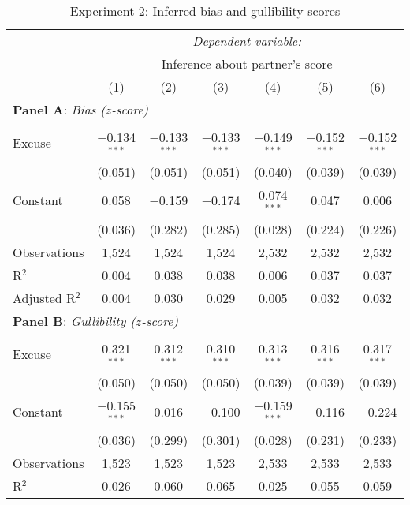 \begin{table}[!htbp] \centering 
  \caption{Experiment 2: Inferred bias and gullibility scores}
  \label{t:1-score}
\begin{threeparttable}
\begin{tabular}{@{\hspace{5pt}}l@{\hspace{5pt}}cccccc} 
\toprule 
 & \multicolumn{6}{c}{\textit{Dependent variable:}} \\ 
\cmidrule(rr){2-7} 
 & \multicolumn{6}{c}{Inference about partner's score} \\ 
 & (1) & (2) & (3) & (4) & (5) & (6)\\ 
\midrule  
\midrule
\multicolumn{7}{l}{\textbf{Panel A}: \textit{Bias ($z$-score)}} \\
\midrule
\\[-2.1ex] Excuse & $-$0.134$^{***}$ & $-$0.133$^{***}$ & $-$0.133$^{***}$ & $-$0.149$^{***}$ & $-$0.152$^{***}$ & $-$0.152$^{***}$ \\ 
  & (0.051) & (0.051) & (0.051) & (0.040) & (0.039) & (0.039) \\ 
 \addlinespace 
 Constant & 0.058 & $-$0.159 & $-$0.174 & 0.074$^{***}$ & 0.047 & 0.006 \\ 
  & (0.036) & (0.282) & (0.285) & (0.028) & (0.224) & (0.226) \\ 
 \addlinespace 
\midrule  
Observations & 1,524 & 1,524 & 1,524 & 2,532 & 2,532 & 2,532 \\ 
R$^{2}$ & 0.004 & 0.038 & 0.038 & 0.006 & 0.037 & 0.037 \\ 
Adjusted R$^{2}$ & 0.004 & 0.030 & 0.029 & 0.005 & 0.032 & 0.032 \\ 
\midrule
\midrule
\multicolumn{7}{l}{\textbf{Panel B}: \textit{Gullibility ($z$-score)}} \\
\midrule
\\[-2.1ex] Excuse & 0.321$^{***}$ & 0.312$^{***}$ & 0.310$^{***}$ & 0.313$^{***}$ & 0.316$^{***}$ & 0.317$^{***}$ \\ 
  & (0.050) & (0.050) & (0.050) & (0.039) & (0.039) & (0.039) \\ 
 \addlinespace 
 Constant & $-$0.155$^{***}$ & 0.016 & $-$0.100 & $-$0.159$^{***}$ & $-$0.116 & $-$0.224 \\ 
  & (0.036) & (0.299) & (0.301) & (0.028) & (0.231) & (0.233) \\ 
 \addlinespace 
\midrule  
Observations & 1,523 & 1,523 & 1,523 & 2,533 & 2,533 & 2,533 \\ 
R$^{2}$ & 0.026 & 0.060 & 0.065 & 0.025 & 0.055 & 0.059 \\ 

\end{tabular}
\end{threeparttable}
\end{table}
